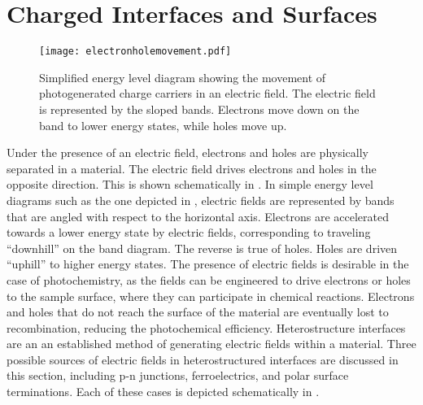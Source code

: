 \section{Charged Interfaces and Surfaces}
\label{sec:background.charged}

\begin{figure}
\begin{center}
\texttt{[image: electronholemovement.pdf]}
\caption[Movement of photogenerated charge carriers]{%
	Simplified energy level diagram showing the movement of photogenerated charge carriers in an electric field. The electric field is represented by the sloped bands. Electrons move down on the band to lower energy states, while holes move up.}
\label{fig:electronholemovement}
\end{center}
\end{figure}


Under the presence of an electric field, electrons and holes are physically separated in a material. The electric field drives electrons and holes in the opposite direction. This is shown schematically in . In simple energy level diagrams such as the one depicted in , electric fields are represented by bands that are angled with respect to the horizontal axis. Electrons are accelerated towards a lower energy state by electric fields, corresponding to traveling ``downhill'' on the band diagram. The reverse is true of holes. Holes are driven ``uphill'' to higher energy states. The presence of electric fields is desirable in the case of photochemistry, as the fields can be engineered to drive electrons or holes to the sample surface, where they can participate in chemical reactions. Electrons and holes that do not reach the surface of the material are eventually lost to recombination, reducing the photochemical efficiency. Heterostructure interfaces are an an established method of generating electric fields within a material. Three possible sources of electric fields in heterostructured interfaces are discussed in this section, including p-n junctions, ferroelectrics, and polar surface terminations. Each of these cases is depicted schematically in . 

